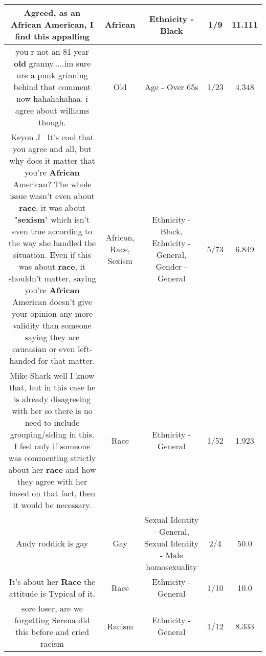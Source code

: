 \documentclass[11pt]{article}
\newlength\mylength
\begin{document}
\begin{center}
\begin{longtable}{|C{.65\mylength}|C{.30\mylength}|C{.12\mylength}|C{.12\mylength}|C{.12\mylength}|}
  \small Agreed, as an \textbf{African} American, I find this appalling\normalsize   & African & Ethnicity - Black & 1/9 & 11.111 \\  \hline
  \small you r not an 81 year \textbf{old} granny.....im sure ure a punk grinning behind that comment now hahahahahaa. i agree about williams though.\normalsize   & Old & Age - Over 65s & 1/23 & 4.348 \\  \hline
  \small Keyon J  It's cool that you agree and all, but why does it matter that you're \textbf{African} American? The whole issue wasn't even about \textbf{race}, it was about "\textbf{sexism}" which isn't even true according to the way she handled the situation. Even if this was about \textbf{race}, it shouldn't matter, saying you're \textbf{African} American doesn't give your opinion any more validity than someone saying they are caucasian or even left-handed for that matter.\normalsize   & African, Race, Sexism & Ethnicity - Black, Ethnicity - General, Gender - General & 5/73 & 6.849 \\  \hline
  \small Mike Shark well I know that, but in this case he is already disagreeing with her so there is no need to include grouping/siding in this. I feel only if someone was commenting strictly about her \textbf{race} and how they agree with her based on that fact, then it would be necessary.\normalsize   & Race & Ethnicity - General & 1/52 & 1.923 \\  \hline
  \small Andy roddick is gay\normalsize   & Gay & Sexual Identity - General, Sexual Identity - Male homosexuality & 2/4 & 50.0 \\  \hline
  \small It's about her \textbf{Race} the attitude is Typical of it.\normalsize   & Race & Ethnicity - General & 1/10 & 10.0 \\  \hline
  \small sore loser, are we forgetting Serena did this before and cried racism\normalsize   & Racism & Ethnicity - General & 1/12 & 8.333 \\  \hline

\end{longtable}
\end{center}
\end{document}
